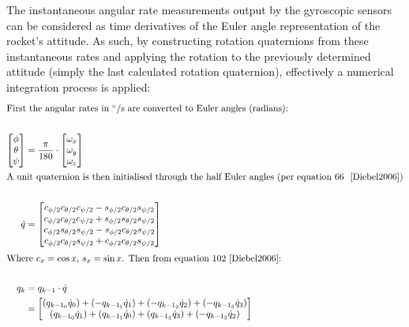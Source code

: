 The instantaneous angular rate measurements output by the gyroscopic sensors can be considered as time derivatives of the Euler angle representation of the rocket's attitude. As such, by constructing rotation quaternions from these instantaneous rates and applying the rotation to the previously determined attitude (simply the last calculated rotation quaternion), effectively a numerical integration process is applied:\\[0.5em]
{
\setlength{\belowdisplayskip}{5pt}%
\setlength{\abovedisplayskip}{-15pt}%
\begin{align*}
  \intertext{First the angular rates in $\unit{\degree}/\unit{\second}$ are converted to Euler angles (radians):}\\
  \begin{bmatrix}
    \phi\\\theta\\\psi
    \end{bmatrix} &= \frac{\pi}{180}\cdot\begin{bmatrix}
                                        \omega_x\\\omega_y\\\omega_z
                                        \end{bmatrix}\\
    \intertext{A unit quaternion is then initialised through the half Euler angles (per equation 66 ~\cite{Diebel2006})}\\
    \dot q &= 
    \begin{bmatrix}
      c_{\phi/2}c_{\theta/2}c_{\psi/2}-s_{\phi/2}c_{\theta/2}s_{\psi/2}\\
      c_{\phi/2}c_{\theta/2}c_{\psi/2}+s_{\phi/2}s_{\theta/2}s_{\psi/2}\\
      c_{\phi/2}s_{\theta/2}s_{\psi/2}-s_{\phi/2}c_{\theta/2}s_{\psi/2}\\
      c_{\phi/2}c_{\theta/2}s_{\psi/2}+c_{\phi/2}c_{\theta/2}s_{\psi/2}\\
    \end{bmatrix}\\[0.5ex]
    \intertext{Where $c_x=\cos{x}$, $s_x=\sin{x}$. Then from equation 102~\cite{Diebel2006}:}\\
    q_{k} &= q_{k-1}\cdot\dot q\\
          &= \begin{bmatrix}
            (q_{{k-1}_0}  \dot q_0) + (-q_{{k-1}_1}  \dot q_1) + (-q_{{k-1}_2}  \dot q_2) + (-q_{{k-1}_3}  \dot q_3)\\
            (q_{{k-1}_0}  \dot q_1) + (q_{{k-1}_1}  \dot q_0) + (q_{{k-1}_2}  \dot q_3) + (-q_{{k-1}_3}  \dot q_2)\\

\end{bmatrix}
\end{align*}}
